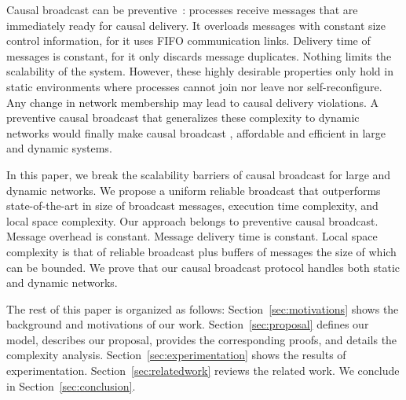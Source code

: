Causal broadcast can be preventive~\cite{friedman2004causal}: processes receive
messages that are immediately ready for causal delivery. It overloads messages
with constant size control information, for it uses FIFO communication
links. Delivery time of messages is constant, for it only discards message
duplicates. Nothing limits the scalability of the system.  However, these highly
desirable properties only hold in static environments where processes cannot
join nor leave nor self-reconfigure. Any change in network membership may lead
to causal delivery violations. A preventive causal broadcast that generalizes
these complexity to dynamic networks would finally make causal broadcast
, affordable and efficient in large and dynamic systems.

In this paper, we break the scalability barriers of causal broadcast for large
and dynamic networks. We propose a uniform reliable broadcast that outperforms
state-of-the-art in size of broadcast messages, execution time complexity, and
local space complexity. Our approach belongs to preventive causal
broadcast. Message overhead is constant. Message delivery time is
constant. Local space complexity is that of reliable broadcast plus buffers of
messages the size of which can be bounded.
We prove that our causal broadcast protocol handles both static and dynamic
networks. 


The rest of this paper is organized as follows: Section~\ref{sec:motivations}
shows the background and motivations of our
work. %
Section~\ref{sec:proposal} defines our model, describes our proposal, provides
the corresponding proofs, and details the complexity
analysis. Section~\ref{sec:experimentation} shows the results of
experimentation.  Section~\ref{sec:relatedwork} reviews the related work. We
conclude in Section~\ref{sec:conclusion}.


